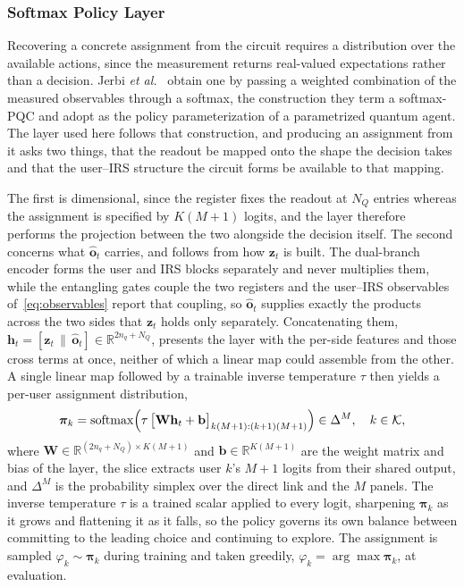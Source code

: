 \documentclass[12pt,onecolumn]{IEEEtran}
\begin{document}
\subsubsection{Softmax Policy Layer}
\label{sec:vqc_policy}

Recovering a concrete assignment from the circuit requires a distribution over the available actions, since the measurement returns real-valued expectations rather than a decision.
Jerbi \emph{et al.}~\cite{jerbi2021parametrized} obtain one by passing a weighted combination of the measured observables through a softmax, the construction they term a softmax-PQC and adopt as the policy parameterization of a parametrized quantum agent.
The layer used here follows that construction, and producing an assignment from it asks two things, that the readout be mapped onto the shape the decision takes and that the user--IRS structure the circuit forms be available to that mapping.

The first is dimensional, since the register fixes the readout at $N_Q$ entries whereas the assignment is specified by $K(M{+}1)$ logits, and the layer therefore performs the projection between the two alongside the decision itself.
The second concerns what $\hat{\mathbf{o}}_t$ carries, and follows from how $\mathbf{z}_t$ is built.
The dual-branch encoder forms the user and IRS blocks separately and never multiplies them, while the entangling gates couple the two registers and the user--IRS observables of~\eqref{eq:observables} report that coupling, so $\hat{\mathbf{o}}_t$ supplies exactly the products across the two sides that $\mathbf{z}_t$ holds only separately.
Concatenating them, $\mathbf{h}_t = [\mathbf{z}_t \,\|\, \hat{\mathbf{o}}_t] \in \mathbb{R}^{2n_q + N_Q}$, presents the layer with the per-side features and those cross terms at once, neither of which a linear map could assemble from the other.
A single linear map followed by a trainable inverse temperature $\tau$ then yields a per-user assignment distribution,
\begin{equation}
    \boldsymbol{\pi}_k
    =
    \mathrm{softmax}\Bigl(\tau\,\bigl[\mathbf{W}\mathbf{h}_t+\mathbf{b}\bigr]_{k(M{+}1):(k{+}1)(M{+}1)}\Bigr)
    \in \Delta^{M},
    \quad k \in \mathcal{K},
    \label{eq:pi_k}
\end{equation}
where $\mathbf{W}\in\mathbb{R}^{(2n_q+N_Q)\times K(M+1)}$ and $\mathbf{b}\in\mathbb{R}^{K(M+1)}$ are the weight matrix and bias of the layer, the slice extracts user $k$'s $M+1$ logits from their shared output, and $\Delta^{M}$ is the probability simplex over the direct link and the $M$ panels.
The inverse temperature $\tau$ is a trained scalar applied to every logit, sharpening $\boldsymbol{\pi}_k$ as it grows and flattening it as it falls, so the policy governs its own balance between committing to the leading choice and continuing to explore.
The assignment is sampled $\varphi_k \sim \boldsymbol{\pi}_k$ during training and taken greedily, $\varphi_k = \arg\max \boldsymbol{\pi}_k$, at evaluation.
\end{document}
